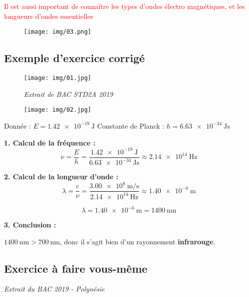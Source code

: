 \documentclass[a4paper,12pt]{article}
\begin{document}
  \textcolor{red}{Il est aussi important de connaître les types d'ondes électro magnétiques, et les longueurs d'ondes essentielles}

\begin{figure}[H]
  \centering
  \texttt{[image: img/03.png]}
\end{figure}

\subsection*{Exemple d'exercice corrigé}

\begin{figure}[H]
  \centering
  \texttt{[image: img/01.jpg]}
  \caption*{\textit{Extrait de BAC STD2A 2019}}
\end{figure}

\begin{figure}[H]
  \centering
  \texttt{[image: img/02.jpg]}
\end{figure}


Donnée : $E = \SI{1.42e-19}{\joule}$
Constante de Planck : $h = \SI{6.63e-34}{\joule\second}$

\vspace{0.5em}

\textbf{1. Calcul de la fréquence :}
\[
\nu = \dfrac{E}{h} = \dfrac{\SI{1.42e-19}{\joule}}{\SI{6.63e-34}{\joule\second}} \approx \SI{2.14e14}{\hertz}
\]

\vspace{0.5em}

\textbf{2. Calcul de la longueur d'onde :}
\[
\lambda = \dfrac{c}{\nu} = \dfrac{\SI{3.00e8}{\meter\per\second}}{\SI{2.14e14}{\hertz}} \approx \SI{1.40e-6}{\meter}
\]

\[
\lambda = \SI{1.40e-6}{\meter} = \SI{1400}{\nano\meter}
\]

\vspace{0.5em}

\textbf{3. Conclusion :}

$\SI{1400}{\nano\meter} > \SI{700}{\nano\meter}$, donc il s'agit bien d'un rayonnement \textbf{infrarouge}.

\subsection*{Exercice à faire vous-même}

\vspace{1em}
\textit{Extrait du BAC 2019 - Polynésie}
\end{document}
